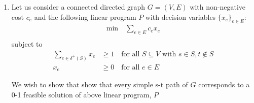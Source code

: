 \documentclass[12pt]{exam}
\newtheorem{lemma}[theorem]{Lemma}
\begin{document}
\begin{questions}
\begin{solution}
\begin{enumerate}[label=(\alph*)]
      \begin{lemma}
        Whenever $y_F \neq 0$, $\{x_e\}$ satisfies the $F$-th constraint of $P$ with equality.
      \end{lemma}
      \begin{proof}
        Let us consider all $y_F \neq 0$ in our proposed solution to the dual from above. Note that we only have $n-1$ such sets, defined above as $F_1, \cdots, F_{n-1}$. Then we have:
        \begin{align*}
          \sum_{e \in F_i} x_e &= i \tag{Each new set adds one edge output by Kruskal's} \\
          &= |V| - (|V| - i) \tag{Adding $0$} \\
          &= |V| - \kappa(F_i) \tag{See below}
        \end{align*}
        The last line follows from the fact that $G = (V,F_i)$ is the subgraph containing only the first $i$ edges forming the a spanning tree of $G$ (which means it contains $i + 1$ vertices) and edges which led to cycles. As such, $\kappa(F_i) = |V| - i$.

        We have therefore shown that the $F$-th constraint is satisfied with equality, concluding our proof.
      \end{proof}

    Putting the three lemmas together, using the results from class we now know that the output from Kruskal's is the maximal spanning tree since it the optimal solution to the first linear program.

    \item
      Let us consider a connected directed graph $G= (V,E)$ with non-negative cost $c_e$ and the following linear program $P$ with decision variables $\{ x_e \}_{e \in E}$:
          \begin{align}
            \text{min} \quad \sum_{e \in E} c_e x_e \label{p7:obj_2} \\
          \end{align}
          subject to
          \begin{align}
            \sum_{e \in \delta^+(S)} x_e &\geq 1 \quad \text{for all } S \subseteq V \text{ with } s \in S, t \notin S \label{p7:constraint2_1} \\{}
            x_e &\geq 0 \quad \text{for all } e \in E \label{p7:constraint2_2}
          \end{align}


        We wish to show that show that every simple s-t path of $G$ corresponds to a 0-1 feasible solution of above linear program, $P$


\end{enumerate}
\end{solution}
\end{questions}
\end{document}
